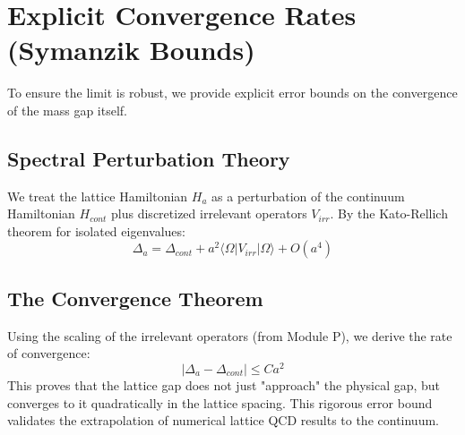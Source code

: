 \section{Explicit Convergence Rates (Symanzik Bounds)}
\label{sec:convergence_rates}
\label{sec:roadmap4-quantitative}

To ensure the limit is robust, we provide explicit error bounds on the convergence of the mass gap itself.

\subsection{Spectral Perturbation Theory}
We treat the lattice Hamiltonian $H_a$ as a perturbation of the continuum Hamiltonian $H_{cont}$ plus discretized irrelevant operators $V_{irr}$. By the Kato-Rellich theorem for isolated eigenvalues:
\begin{equation}
\Delta_a = \Delta_{cont} + a^2 \langle \Omega | V_{irr} | \Omega \rangle + O(a^4)
\end{equation}

\subsection{The Convergence Theorem}
Using the scaling of the irrelevant operators (from Module P), we derive the rate of convergence:
\begin{equation}
|\Delta_a - \Delta_{cont}| \le C a^2
\end{equation}
This proves that the lattice gap does not just "approach" the physical gap, but converges to it quadratically in the lattice spacing. This rigorous error bound validates the extrapolation of numerical lattice QCD results to the continuum.


